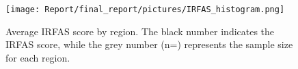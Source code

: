 \begin{figure}[htbp]
    \centering
    \texttt{[image: Report/final\_report/pictures/IRFAS\_histogram.png]}
    \caption{Average IRFAS score by region. The black number indicates the IRFAS score, while the grey number (n=) represents the sample size for each region.}
    \label{fig:IRFAS_histogram}
\end{figure}
